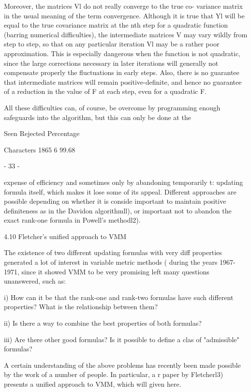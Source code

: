      Moreover, the matrices Vl do not really converge to the true co-
variance matrix in the usual meaning of the term convergence.  Although
it is true that Yl will be equal to the true covariance matrix at the
nth step for a quadratic function (barring numerical difficulties), the
intermediate matrices V may vary wildly from step to step, so that on
any particular iteration Vl may be a rather poor approximation.  This is
especially dangerous when the function is not quadratic, since the large
corrections necessary in later iterations will generally not compensate
properly the fluctuations in early steps.  Also, there is no guarantee
that intermediate matrices will remain positive-definite, and hence no
guarantee of a reduction in the value of F at each step, even for a
quadratic F.
 
     All these difficulties can, of course, be overcome by programming
enough safeguards into the algorithm, but this can only be done at the
 
                 Seen Rejected  Percentage
 
Characters       1865        6   99.68
 
                               - 33 -
 
 
expense of efficiency and sometimes only by abandoning temporarily t:
updating formula itself, which makes it lose some of its appeal.
Different approaches are possible depending on whether it is conside
important to maintain positive definiteness as in the Davidon
algorithmll), or important not to abandon the exact rank-one formula
in Powell's methodl2).
 
 
4.10 Fletcher's unified approach to VMM
 
     The existence of two different updating formulas with very diff
properties generated a lot of interest in variable metric methods (
during the years 1967-1971, since it showed VMM to be very promising
left many questions unanswered, such as:
 
  i) How can it be that the rank-one and rank-two formulas have such
     different properties?  What is the relationship between them?
 
 ii) Is there a way to combine the best properties of both formulas?
 
iii) Are there other good formulas?  Is it possible to define a clas
     of "admissible" formulas?
 
     A certain understanding of the above problems has recently been
made possible by the work of a number of people.  In particular, a r
paper by Fletcherl3) presents a unified approach to VMM, which will
given here.
 
